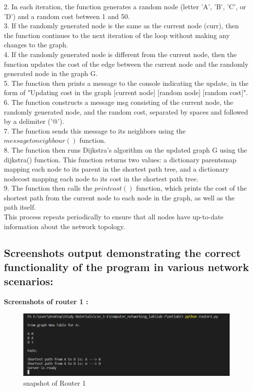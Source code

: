 \documentclass[11pt]{article}
\begin{document}
    2. In each iteration, the function generates a random node (letter 'A', 'B', 'C', or 'D') and a random cost between 1 and 50.\\

    3. If the randomly generated node is the same as the current node (curr), then the function continues to the next iteration of the loop without making any changes to the graph.\\

    4. If the randomly generated node is different from the current node, then the function updates the cost of the edge between the current node and the randomly generated node in the graph G.\\

    5. The function then prints a message to the console indicating the update, in the form of "Updating cost in the graph [current node] [random node] [random cost]".\\

    6. The function constructs a message msg consisting of the current node, the randomly generated node, and the random cost, separated by spaces and followed by a delimiter ('@').\\

    7. The function sends this message to its neighbors using the
 $message to neighbour()$ function.\\

    8. The function then runs Dijkstra's algorithm on the updated graph G using the dijkstra() function. This function returns two values: a dictionary parentsmap mapping each node to its parent in the shortest path tree, and a dictionary nodecost mapping each node to its cost in the shortest path tree.\\

    9. The function then calls the $print cost()$ function, which prints the cost of the shortest path from the current node to each node in the graph, as well as the path itself.\\

    
This process repeats periodically to ensure that all nodes have up-to-date information about the network topology.

\subsection{Screenshots output demonstrating the correct functionality of the program in various network scenarios: }
\textbf{Screenshots of router 1 : }\\[12pt]
 \begin{figure}[!h]
\centering
\includegraphics[width=\textwidth]{r1.png}
\caption{snapshot of Router 1}
\end{figure}
\FloatBarrier
\end{document}
